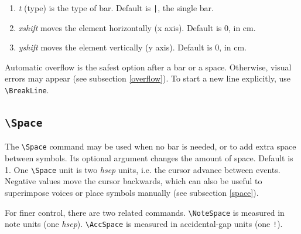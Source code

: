 \documentclass[final]{article}
\newcommand{\TTT}[2][0]{\Text[yshift=#1]{\texttt{\textbackslash #2}}}
\begin{document}
	\begin{enumerate}[-]
		\item \textsl{t} (type) is the type of bar. Default is \texttt{|}, the single bar.
		\item \textsl{xshift} moves the element horizontally (x axis). Default is 0, in cm.
		\item \textsl{yshift} moves the element vertically (y axis). Default is 0, in cm.
	\end{enumerate}
	
	\begin{center}
		\begin{mousik}
			\TTT{Barline}
			\Barline
			\Space[0.5]
			\Barline[t= ||]
			\Space[0.5]
			\Barline[t= |.]
			\Space[0.5]
			\Barline[t= |:]
			\Space[0.5]
			\Barline[t= :|:]
			\Space[0.5]
			\Barline[t= :|]
			\Space[0.5]
			\Barline[t= :]
		\end{mousik}
	\end{center}
	
	Automatic overflow is the safest option after a bar or a space. Otherwise, visual errors may appear (see subsection \ref{overflow}). To start a new line explicitly, use \verb|\BreakLine|.
	
	\subsection{\texttt{\textbackslash Space}}
	The \verb|\Space| command may be used when no bar is needed, or to add extra space between symbols. Its optional argument changes the amount of space. Default is 1. One \verb|\Space| unit is two \textsl{hsep} units, i.e. the cursor advance between events. Negative values move the cursor backwards, which can also be useful to superimpose voices or place symbols manually (see subsection \ref{space}).

	For finer control, there are two related commands. \verb|\NoteSpace| is measured in note units (one \textsl{hsep}). \verb|\AccSpace| is measured in accidental-gap units (one \texttt{!}).
	
	\begin{center}
		\begin{mousik}
			\Barline
			\Text{\hspace*{-55pt}\ttfamily[-0.5]}
			\Space[-0.5]
			\Barline
			\Text{\hspace*{-25pt}\ttfamily[0]}
			\Space[0]
			\Barline
			\Text{\hspace*{-14pt}\ttfamily[0.5]}
			\Space[0.5]
			\Barline
			\Text{\hspace*{-0.5pt}\ttfamily[1]}
			\Space[1]
			\Barline
			\Text{\hspace*{13pt}\ttfamily[1.5]}
			\Space[1.5]
			\Barline[t=|.]
		\end{mousik}
	\end{center}
	
\end{document}
